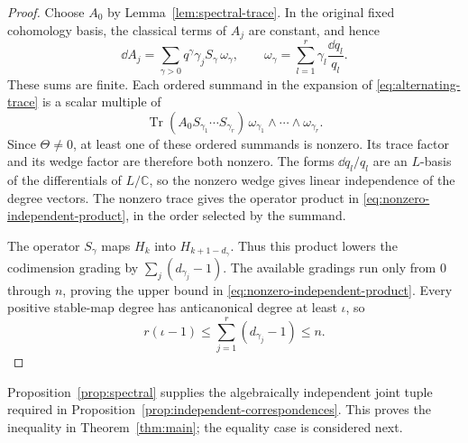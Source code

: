 \begin{proof}
Choose $A_0$ by Lemma~\ref{lem:spectral-trace}. In the original fixed
cohomology basis, the classical terms of $A_j$ are constant, and hence
\[
 \dd A_j=\sum_{\gamma>0}q^\gamma\gamma_jS_\gamma\,\omega_\gamma,
 \qquad
 \omega_\gamma=\sum_{l=1}^r\gamma_l\frac{\dd q_l}{q_l}.
\]
These sums are finite. Each ordered summand in the expansion of
\eqref{eq:alternating-trace} is a scalar multiple of
\[
 \operatorname{Tr}(A_0S_{\gamma_1}\cdots S_{\gamma_r})\,
 \omega_{\gamma_1}\wedge\cdots\wedge\omega_{\gamma_r}.
\]
Since $\Theta\ne0$, at least one of these ordered summands is nonzero.
Its trace factor and its wedge factor are therefore both nonzero.
The forms $\dd q_l/q_l$ are an $L$-basis of the differentials of
$L/\mathbb C$, so the nonzero wedge gives linear independence of
the degree vectors. The nonzero trace gives the operator product in
\eqref{eq:nonzero-independent-product}, in the order selected by the
summand.

The operator $S_\gamma$ maps $H_k$ into $H_{k+1-d_\gamma}$. Thus this
product lowers the codimension grading by $\sum_j(d_{\gamma_j}-1)$.
The available gradings run only from $0$ through $n$, proving the upper
bound in \eqref{eq:nonzero-independent-product}. Every positive
stable-map degree has anticanonical degree at least $\iota$, so
\[
 r(\iota-1)\le\sum_{j=1}^r(d_{\gamma_j}-1)\le n.
\]
\end{proof}

Proposition~\ref{prop:spectral} supplies the algebraically independent
joint tuple required in Proposition~\ref{prop:independent-correspondences}.
This proves the inequality in Theorem~\ref{thm:main}; the equality case
is considered next.
